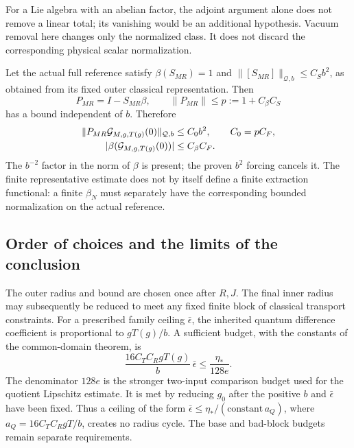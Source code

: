 \documentclass[11pt]{article}
\theoremstyle{remark}
\begin{document}
For a Lie algebra with an abelian factor, the adjoint argument
alone does not remove a linear total; its vanishing would be
an additional hypothesis. Vacuum removal here changes only
the normalized class. It does not discard the corresponding
physical scalar normalization.

Let the actual full reference satisfy
$\beta(S_{MR})=1$ and
$\|[S_{MR}]\|_{\mathcal Q,b}\le C_Sb^2$, as obtained
from its fixed outer classical representation. Then
\begin{equation}
 P_{MR}=I-S_{MR}\beta,
 \qquad \|P_{MR}\|\le p:=1+C_\beta C_S
 \label{zif-projection}
\end{equation}
has a bound independent of $b$. Therefore
\begin{align}
 \|P_{MR}\mathcal G_{M,g,T(g)}(0)\|_{\mathcal Q,b}
      &\le C_0b^2,\qquad C_0=pC_F,\notag\\
 |\beta(\mathcal G_{M,g,T(g)}(0))|
      &\le C_\beta C_F.
 \label{zif-extracted-beta}
\end{align}
The $b^{-2}$ factor in the norm of $\beta$ is present;
the proven $b^2$ forcing cancels it. The finite representative
estimate does not by itself define a finite extraction
functional: a finite $\beta_N$ must separately have the
corresponding bounded normalization on the actual reference.

\subsection{Order of choices and the limits of the conclusion}
\label{zif-scope-section}

The outer radius and bound are chosen once after $R,J$.
The final inner radius may subsequently be reduced to meet
any fixed finite block of classical transport constraints.
For a prescribed family ceiling $\bar\epsilon$, the inherited
quantum difference coefficient is proportional to $gT(g)/b$.
A sufficient budget, with the constants of the common-domain
theorem, is
\begin{equation}
 \frac{16C_TC_RgT(g)}b\,\bar\epsilon
       \le\frac{\eta_*}{128e}.
 \label{zif-inherited-budget}
\end{equation}
The denominator $128e$ is the stronger two-input comparison
budget used for the quotient Lipschitz estimate. It is met by
reducing $g_0$ after the positive $b$ and
$\bar\epsilon$ have been fixed. Thus a ceiling of the form
$\bar\epsilon\le\eta_*/(\text{constant}\,a_Q)$,
where $a_Q=16C_TC_RgT/b$, creates no radius cycle.
The base and bad-block budgets remain separate requirements.
\end{document}
